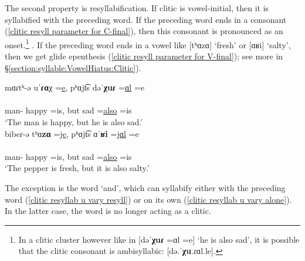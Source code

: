 The second property is resyllabification. If clitic is vowel-initial, then it is syllabified with the preceding word.  If the preceding word ends in a consonant (\ref{clitic resyll parameter for C-final}), then this consonant is   pronounced as an onset.\footnote{In a clitic cluster however like in [dəˈ\textbf{χuɾ} =ɑl =e] `he is also sad', it is possible that the clitic consonant is ambisyllabic: [də.ˈ\textbf{χu}.ɾɑl.le]. } . If the preceding word ends in a vowel like [tʰɑzɑ] `fresh' or [ɑʁi] `salty', then we get glide epenthesis (\ref{clitic resyll parameter for V-final}); see more in \S\ref{section:syllable:VowelHiatus:Clitic}).


\begin{exe}
	\ex \begin{xlist}
		\ex \glll mɑɾtʰ-ə uˈ\textbf{ɾɑ}χ =\underline{e},  pʰɑjt͡s  dəˈ\textbf{χuɾ} =\underline{ɑl} =e\\
		[mɑɾ.tʰə u.ˈ\textbf{ɾɑ}. \underline{χe}, pʰɑjt͡s.  də.ˈ\textbf{χu}.  ɾɑ. le] \\
		man-{} happy =is, but sad =\underline{also} =is \\
		\trans `The man is happy, but he is also sad.'\label{clitic resyll parameter for C-final} \\
		\ex \glll bibeɾ-ə tʰɑ\textbf{zɑ} =\underline{je},  pʰɑjt͡s  ɑˈ\textbf{ʁi} =\underline{jɑl} =e\\
		[bi.be.ɾə tʰɑ.ˈ\textbf{zɑ}. \underline{je}, pʰɑjt͡s.  ɑ.ˈ\textbf{ʁi}. \underline{jɑ}  .le] \\
		man-{} happy =is, but sad =\underline{also} =is \\
		\trans `The pepper is fresh, but it is also salty.'\label{clitic resyll parameter for V-final} \\
	\end{xlist}
\end{exe}

The exception is the word `and', which can  syllabify either with the preceding word (\ref{clitic resyllab u vary resyll}) or on its own (\ref{clitic resyllab u vary alone}). In the latter case, the word is no longer acting as a clitic.

